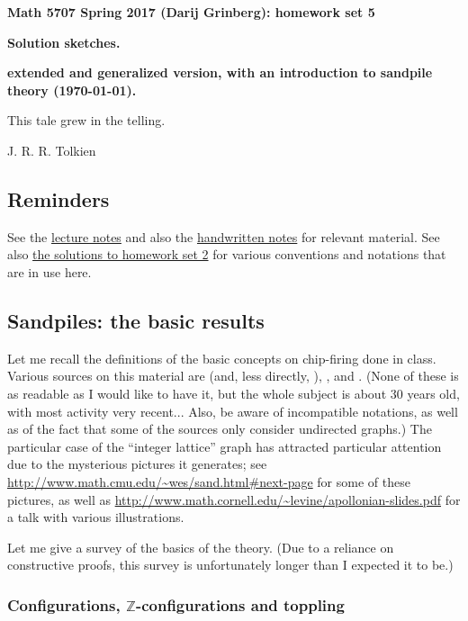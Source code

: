 \documentclass[numbers=enddot,12pt,final,onecolumn,notitlepage]{scrartcl}%
\theoremstyle{definition}
\newcommand{\ZZ}{\mathbb{Z}}
\begin{document}
\begin{center}
\textbf{Math 5707 Spring 2017 (Darij Grinberg): homework set 5}

\textbf{Solution sketches.}

\textbf{extended and generalized version, with an introduction to sandpile theory (\today).}
\end{center}

\epigraph{This tale grew in the telling.}{J. R. R. Tolkien}

\tableofcontents

\subsection{Reminders}

See the
\href{http://www-users.math.umn.edu/~dgrinber/5707s17/nogra.pdf}{lecture notes}
and also the
\href{http://www-users.math.umn.edu/~dgrinber/5707s17/}{handwritten notes}
for relevant material.
See also
\href{http://www-users.math.umn.edu/~dgrinber/5707s17/hw2s.pdf}{the solutions to homework set 2}
\cite{hw2s}
for various conventions and notations that are in use here.

\subsection{Sandpiles: the basic results}

Let me recall the definitions of the basic concepts on chip-firing
done in class.
Various sources on this material are
\cite{BjoLov92} (and, less directly, \cite{BjLoSh91}),
\cite{HLMPPW13}, \cite[Lectures 29--31]{Musike09} and \cite{CorPet16}.
(None of these is as readable as I would like to have it, but the
whole subject is about 30 years old, with most activity very
recent...
Also, be aware of incompatible notations, as well as of the fact that
some of the sources only consider undirected graphs.)
The particular case of the ``integer lattice'' graph has attracted
particular attention due to the mysterious pictures it generates;
see \url{http://www.math.cmu.edu/~wes/sand.html#next-page} for some
of these pictures, as well as
\url{http://www.math.cornell.edu/~levine/apollonian-slides.pdf} for a
talk with various illustrations.

Let me give a survey of the basics of the theory.
(Due to a reliance on constructive proofs, this survey is
unfortunately longer than I expected it to be.)

\subsubsection{Configurations, $\ZZ$-configurations and toppling}
\end{document}
